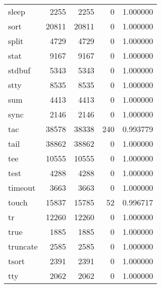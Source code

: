 \begin{tabular}{lrrrr}
sleep     &                     2255 &         2255 &             0 &                 1.000000 \\
sort      &                    20811 &        20811 &             0 &                 1.000000 \\
split     &                     4729 &         4729 &             0 &                 1.000000 \\
stat      &                     9167 &         9167 &             0 &                 1.000000 \\
stdbuf    &                     5343 &         5343 &             0 &                 1.000000 \\
stty      &                     8535 &         8535 &             0 &                 1.000000 \\
sum       &                     4413 &         4413 &             0 &                 1.000000 \\
sync      &                     2146 &         2146 &             0 &                 1.000000 \\
tac       &                    38578 &        38338 &           240 &                 0.993779 \\
tail      &                    38862 &        38862 &             0 &                 1.000000 \\
tee       &                    10555 &        10555 &             0 &                 1.000000 \\
test      &                     4288 &         4288 &             0 &                 1.000000 \\
timeout   &                     3663 &         3663 &             0 &                 1.000000 \\
touch     &                    15837 &        15785 &            52 &                 0.996717 \\
tr        &                    12260 &        12260 &             0 &                 1.000000 \\
true      &                     1885 &         1885 &             0 &                 1.000000 \\
truncate  &                     2585 &         2585 &             0 &                 1.000000 \\
tsort     &                     2391 &         2391 &             0 &                 1.000000 \\
tty       &                     2062 &         2062 &             0 &                 1.000000 \\

\end{tabular}
